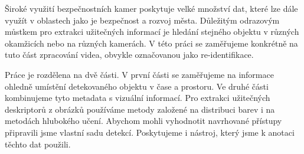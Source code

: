 \documentclass[12pt]{report}
\begin{document}

Široké využití bezpečnostních kamer poskytuje velké množství dat, které lze dále využít v oblastech jako je bezpečnost a rozvoj města. Důležitým odrazovým můstkem pro extrakci užitečných informací je hledání stejného objektu v různých okamžicích nebo na různých kamerách. V této práci se zaměřujeme konkrétně na tuto část zpracování videa, obvykle označovanou jako re-identifikace.

Práce je rozdělena na dvě části. V první části se zaměřujeme na informace ohledně umístění detekovaného objektu v čase a prostoru. Ve druhé části kombinujeme tyto metadata s vizuální informací. Pro extrakci užitečných deskriptorů z obrázků používáme metody založené na distribuci barev i na metodách hlubokého učení. Abychom mohli vyhodnotit navrhované přístupy připravili jsme vlastní sadu detekcí. Poskytujeme i nástroj, který jsme k anotaci těchto dat použili.
\end{document}

